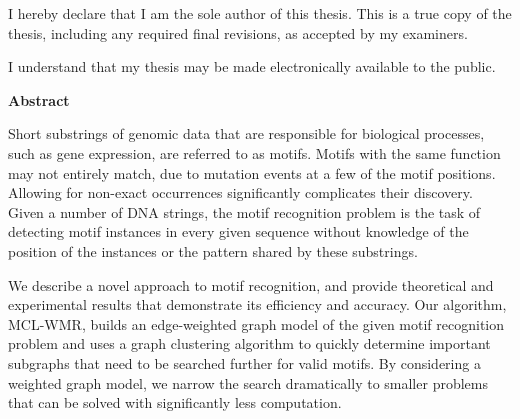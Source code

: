 \pagestyle{plain}
\setcounter{page}{2}

\cleardoublepage %
 


  \noindent
I hereby declare that I am the sole author of this thesis. This is a true copy of the thesis, including any required final revisions, as accepted by my examiners.

  \bigskip
  
  \noindent
I understand that my thesis may be made electronically available to the public.

\cleardoublepage


\begin{center}\textbf{Abstract}\end{center}

 
Short substrings of genomic data that are responsible for biological processes, such as gene expression, are referred to as motifs.  Motifs with the same function may not entirely match, due to mutation events at a few of the motif positions. Allowing for non-exact occurrences significantly complicates their discovery. Given a number of DNA strings, the motif recognition problem is the task of detecting motif instances in every given sequence without knowledge of the position of the instances or the pattern shared by these substrings.  

We describe a novel approach to motif recognition, and provide theoretical and experimental results that demonstrate its efficiency and accuracy. Our algorithm, MCL-WMR, builds an edge-weighted graph model of the given motif recognition problem and uses a graph clustering algorithm to quickly determine important subgraphs that need to be searched further for valid motifs. By considering a weighted graph model, we narrow the search dramatically to smaller problems that can be solved with significantly less computation. 

